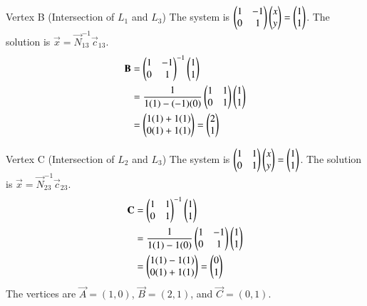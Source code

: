 \documentclass{beamer}
\begin{document}
\begin{frame}{Vertex B (Intersection of $L_1$ and $L_3$)}
The system is $\begin{pmatrix}1 & -1 \\ 0 & 1\end{pmatrix} \begin{pmatrix}x \\ y\end{pmatrix} = \begin{pmatrix}1 \\ 1\end{pmatrix}$. The solution is $\vec{x} = \vec{N}_{13}^{-1}\vec{c}_{13}$.
\begin{align}  
\mathbf{B} &= \begin{pmatrix}1 & -1 \\ 0 & 1\end{pmatrix}^{-1} \begin{pmatrix}1 \\ 1\end{pmatrix} \\
&= \frac{1}{1(1) - (-1)(0)} \begin{pmatrix}1 & 1 \\ 0 & 1\end{pmatrix} \begin{pmatrix}1 \\ 1\end{pmatrix} \\
&= \begin{pmatrix}1(1) + 1(1) \\ 0(1) + 1(1)\end{pmatrix} = \begin{pmatrix}2 \\ 1\end{pmatrix}
\end{align}  
\end{frame}
\begin{frame}{Vertex C (Intersection of $L_2$ and $L_3$)}
The system is $\begin{pmatrix}1 & 1 \\ 0 & 1\end{pmatrix} \begin{pmatrix}x \\ y\end{pmatrix} = \begin{pmatrix}1 \\ 1\end{pmatrix}$. The solution is $\vec{x} = \vec{N}_{23}^{-1}\vec{c}_{23}$.
\begin{align}  
\mathbf{C} &= \begin{pmatrix}1 & 1 \\ 0 & 1\end{pmatrix}^{-1} \begin{pmatrix}1 \\ 1\end{pmatrix} \\
&= \frac{1}{1(1) - 1(0)} \begin{pmatrix}1 & -1 \\ 0 & 1\end{pmatrix} \begin{pmatrix}1 \\ 1\end{pmatrix} \\
&= \begin{pmatrix}1(1) - 1(1) \\ 0(1) + 1(1)\end{pmatrix} = \begin{pmatrix}0 \\ 1\end{pmatrix}
\end{align}  
The vertices are $\vec{A}=(1,0)$, $\vec{B}=(2,1)$, and $\vec{C}=(0,1)$.
\end{frame}
\end{document}
